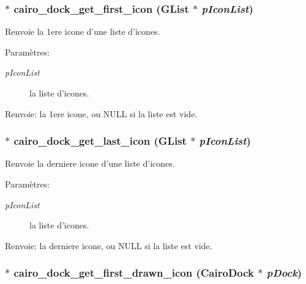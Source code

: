 \subsubsection{$\ast$ cairo\_\-dock\_\-get\_\-first\_\-icon (GList $\ast$ {\em pIconList})}\label{cairo-dock-icons_8h_a33afd0fe00295cedadd9f7ef73d8b1e}


Renvoie la 1ere icone d'une liste d'icones. \begin{Desc}
\item[Paramètres:]
\begin{description}
\item[{\em pIconList}]la liste d'icones. \end{description}
\end{Desc}
\begin{Desc}
\item[Renvoie:]la 1ere icone, ou NULL si la liste est vide. \end{Desc}
\subsubsection{$\ast$ cairo\_\-dock\_\-get\_\-last\_\-icon (GList $\ast$ {\em pIconList})}\label{cairo-dock-icons_8h_dbfc665a5e83340a487626894db56333}


Renvoie la derniere icone d'une liste d'icones. \begin{Desc}
\item[Paramètres:]
\begin{description}
\item[{\em pIconList}]la liste d'icones. \end{description}
\end{Desc}
\begin{Desc}
\item[Renvoie:]la derniere icone, ou NULL si la liste est vide. \end{Desc}
\subsubsection{$\ast$ cairo\_\-dock\_\-get\_\-first\_\-drawn\_\-icon ({\bf CairoDock} $\ast$ {\em pDock})}\label{cairo-dock-icons_8h_6c95bef22b883b260f1ff3537c7fdc44}


